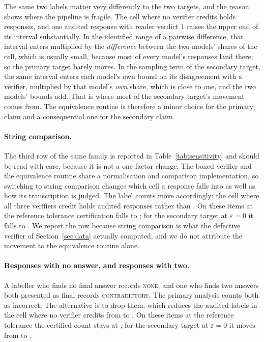 The same two labels matter very differently to the two targets, and the reason shows where the
pipeline is fragile. The cell where no verifier credits holds \CellRejectAll{} responses, and
one audited response with reader verdict $1$ raises the upper end of its interval substantially. In the identified range of a pairwise difference, that
interval enters multiplied by the \emph{difference} between the two models' shares of the cell,
which is usually small, because most of every model's responses land there; so the primary
target barely moves. In the sampling term of the secondary target, the same interval enters each model's own
bound on its disagreement with a verifier, multiplied by that model's \emph{own} share, which is
close to one, and the two models' bounds add. That is where most of the secondary target's
movement comes from. The equivalence routine is therefore a minor choice for the primary claim
and a consequential one for the secondary claim.

\paragraph{String comparison.}
The third row of the same family is reported in Table~\ref{tab:sensitivity} and should be read
with care, because it is not a one-factor change. The boxed verifier and the equivalence routine
share a normalisation and comparison implementation, so switching to string comparison
changes which cell a response falls into as well as how its transcription is judged. The
label counts move accordingly: the cell where all three verifiers credit holds
\SensStringNAgreeAll{} audited responses rather than \AuditNAgreeAll{}. On these items at the
reference tolerance certification falls to \SensStringFixed{}; for the secondary target at
$\varepsilon = 0$ it falls to \SensStringCombined{}. We report the row because string
comparison is what the defective
verifier of Section~\ref{sec:data} actually computed, and we do not attribute the movement to
the equivalence routine alone.

\paragraph{Responses with no answer, and responses with two.}
A labeller who finds no final answer records \textsc{none}, and one who finds two answers both
presented as final records \textsc{contradictory}. The primary analysis counts both as
incorrect. The alternative is to drop them, which reduces the audited labels in the cell where
no verifier credits from \AuditNRejectAll{} to \SensDropNRejectAll{}. On these items at the
reference tolerance the certified count stays at \SensDropFixed{}; for the secondary target
at $\varepsilon = 0$ it moves from \CertEpsZero{} to \SensDropCombined{}.

